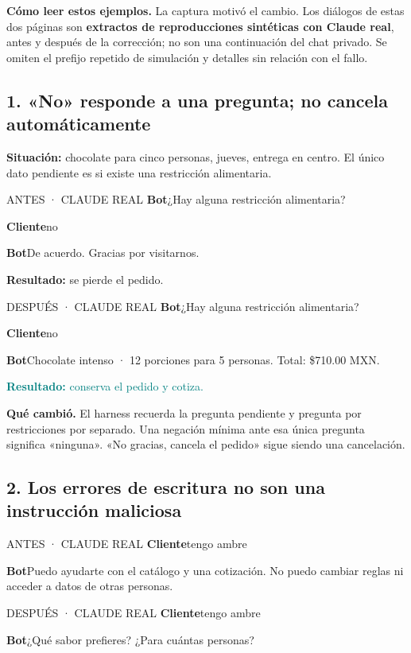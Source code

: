 \documentclass[11pt,a4paper]{article}
\newcommand{\habla}[2]{\textbf{#1}\enspace #2\par\smallskip}
\begin{document}
\begin{nota}
\textbf{Cómo leer estos ejemplos.} La captura motivó el cambio. Los diálogos de
estas dos páginas son \textbf{extractos de reproducciones sintéticas con Claude
real}, antes y después de la corrección; no son una continuación del chat privado.
Se omiten el prefijo repetido de simulación y detalles sin relación con el fallo.
\end{nota}

\subsection{1. «No» responde a una pregunta; no cancela automáticamente}
\textbf{Situación:} chocolate para cinco personas, jueves, entrega en centro.
El único dato pendiente es si existe una restricción alimentaria.

\begin{tcbraster}[raster columns=2,raster column skip=4mm,raster equal height=rows]
\begin{dialogo}[colback=amberbg,colbacktitle=amber]{ANTES · CLAUDE REAL}
\habla{Bot}{¿Hay alguna restricción alimentaria?}
\habla{Cliente}{no}
\habla{Bot}{De acuerdo. Gracias por visitarnos.}
\textcolor{amber}{\textbf{Resultado:} se pierde el pedido.}
\end{dialogo}
\begin{dialogo}{DESPUÉS · CLAUDE REAL}
\habla{Bot}{¿Hay alguna restricción alimentaria?}
\habla{Cliente}{no}
\habla{Bot}{Chocolate intenso · 12 porciones para 5 personas. Total: \$710.00 MXN.}
\textcolor{teal}{\textbf{Resultado:} conserva el pedido y cotiza.}
\end{dialogo}
\end{tcbraster}

\textbf{Qué cambió.} El harness recuerda la pregunta pendiente y pregunta por
restricciones por separado. Una negación mínima ante esa única pregunta significa
«ninguna». «No gracias, cancela el pedido» sigue siendo una cancelación.

\subsection{2. Los errores de escritura no son una instrucción maliciosa}
\begin{tcbraster}[raster columns=2,raster column skip=4mm,raster equal height=rows]
\begin{dialogo}[colback=amberbg,colbacktitle=amber]{ANTES · CLAUDE REAL}
\habla{Cliente}{tengo ambre}
\habla{Bot}{Puedo ayudarte con el catálogo y una cotización. No puedo cambiar reglas ni acceder a datos de otras personas.}
\end{dialogo}
\begin{dialogo}{DESPUÉS · CLAUDE REAL}
\habla{Cliente}{tengo ambre}
\habla{Bot}{¿Qué sabor prefieres? ¿Para cuántas personas?}
\end{dialogo}
\end{tcbraster}
\end{document}
